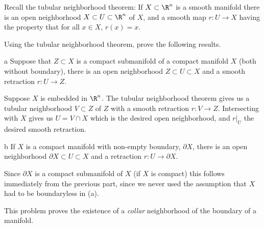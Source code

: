 \documentclass[11pt,letterpaper]{article}
\begin{document}
\begin{problem}
    Recall the tubular neighborhood theorem: If $X\subset \R^n$ is a smooth manifold there is an open neighborhood $X\subset U \subset \R^n$ of $X$, and a smooth map $r : U \to X$ having the property that for all $x\in X$, $r(x)=x$.
\end{problem}

\begin{solution}
    \quad Using the tubular neighborhood theorem, prove the following results.
    \begin{partproblem}{a}
        Suppose that $Z\subset X$ is a compact submanifold of a compact manifold $X$ (both without boundary), there is an open neighborhood $Z\subset U \subset X$ and a smooth retraction $r: U \to Z$.
    \end{partproblem}

    \quad Suppose $X$ is embedded in $\R^n$. The tubular neighborhood theorem gives us a tubular neighborhood $V\subset Z$ of $Z$ with a smooth retraction $r : V \to Z$. Intersecting with $X$ gives us $U=V\cap X$ which is the desired open neighborhood, and $r|_U$ the desired smooth retraction.  
    
    \begin{partproblem}{b}
        If $X$ is a compact manifold with non-empty boundary, $\partial X$, there is an open neighborhood $\partial X\subset U \subset X$ and a retraction $r : U \to \partial X$.
    \end{partproblem}

    \quad Since $\partial X$ is a compact submanifold of $X$ (if $X$ is compact) this follows immediately from the previous part, since we never used the assumption that $X$ had to be boundaryless in (a).
\end{solution}

\begin{problem}
    This problem proves the existence of a \emph{collar} neighborhood of the boundary of a manifold.
\end{problem}
\end{document}
